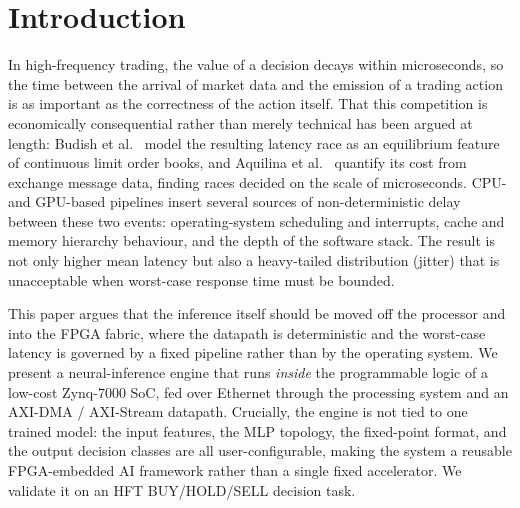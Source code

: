 \documentclass[final,5p,times,twocolumn]{elsarticle}
\begin{document}
\section{Introduction}
In high-frequency trading, the value of a decision decays within microseconds,
so the time between the arrival of market data and the emission of a trading
action is as important as the correctness of the action itself. That this
competition is economically consequential rather than merely technical has been
argued at length: Budish et al.~\cite{Budish2015} model the resulting
latency race as an equilibrium feature of continuous limit order books, and
Aquilina et al.~\cite{Aquilina2022} quantify its cost from exchange message
data, finding races decided on the scale of microseconds. CPU- and
GPU-based pipelines insert several sources of non-deterministic delay between
these two events: operating-system scheduling and interrupts, cache and memory
hierarchy behaviour, and the depth of the software stack. The result is not
only higher mean latency but also a heavy-tailed distribution (jitter) that is
unacceptable when worst-case response time must be bounded.

This paper argues that the inference itself should be moved off the processor
and into the FPGA fabric, where the datapath is deterministic and the
worst-case latency is governed by a fixed pipeline rather than by the operating
system. We present a neural-inference engine that runs \emph{inside} the
programmable logic of a low-cost Zynq-7000 SoC, fed over Ethernet through the
processing system and an AXI-DMA / AXI-Stream datapath. Crucially, the engine
is not tied to one trained model: the input features, the MLP topology, the
fixed-point format, and the output decision classes are all user-configurable,
making the system a reusable FPGA-embedded AI framework rather than a single
fixed accelerator. We validate it on an HFT \mbox{BUY/HOLD/SELL} decision task.

\end{document}
